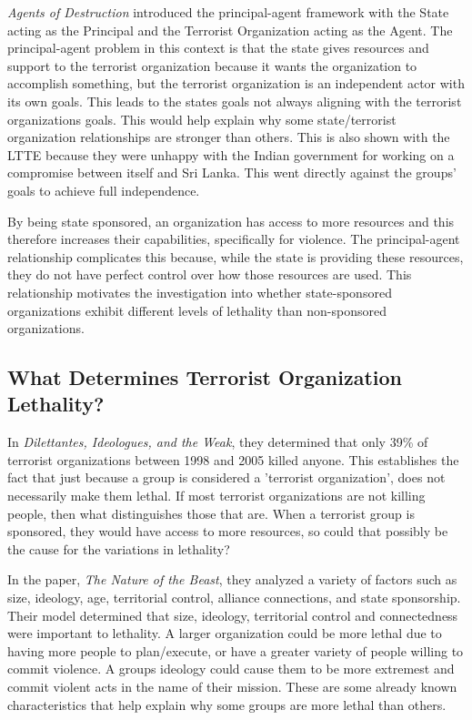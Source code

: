 \documentclass{article}
\begin{document}
\textit{Agents of Destruction} introduced the principal-agent framework with the State acting as the Principal and the Terrorist Organization acting as the Agent. The principal-agent problem in this context is that the state gives resources and support to the terrorist organization because it wants the organization to accomplish something, but the terrorist organization is an independent actor with its own goals. This leads to the states goals not always aligning with the terrorist organizations goals. This would help explain why some state/terrorist organization relationships are stronger than others. This is also shown with the LTTE because they were unhappy with the Indian government for working on a compromise between itself and Sri Lanka. This went directly against the groups' goals to achieve full independence. 

By being state sponsored, an organization has access to more resources and this therefore increases their capabilities, specifically for violence. The principal-agent relationship complicates this because, while the state is providing these resources, they do not have perfect control over how those resources are used. This relationship motivates the investigation into whether state-sponsored organizations exhibit different levels of lethality than non-sponsored organizations. 

\subsection{What Determines Terrorist Organization Lethality?}
In \textit{Dilettantes, Ideologues, and the Weak}, they determined that only 39\% of terrorist organizations between 1998 and 2005 killed anyone. This establishes the fact that just because a group is considered a 'terrorist organization', does not necessarily make them lethal. If most terrorist organizations are not killing people, then what distinguishes those that are. When a terrorist group is sponsored, they would have access to more resources, so could that possibly be the cause for the variations in lethality? 

In the paper, \textit{The Nature of the Beast}, they analyzed a variety of factors such as size, ideology, age, territorial control, alliance connections, and state sponsorship. Their model determined that size, ideology, territorial control and connectedness were important to lethality. A larger organization could be more lethal due to having more people to plan/execute, or have a greater variety of people willing to commit violence. A groups ideology could cause them to be more extremest and commit violent acts in the name of their mission. These are some already known characteristics that help explain why some groups are more lethal than others. 
\end{document}
